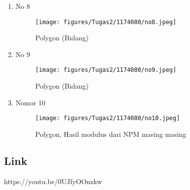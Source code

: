 \begin{enumerate}
\begin{figure}[H]
	\end{figure}
	\item No 8
	
	\begin{figure}[H]
		\texttt{[image: figures/Tugas2/1174080/no8.jpeg]}
		\centering
		\caption{Polygon (Bidang)}
	\end{figure}
	\item No 9
	
	\begin{figure}[H]
		\texttt{[image: figures/Tugas2/1174080/no9.jpeg]}
		\centering
		\caption{Polygon (Bidang)}
	\end{figure}
	\item Nomor 10
	
	\begin{figure}[H]
		\texttt{[image: figures/Tugas2/1174080/no10.jpeg]}
		\centering
		\caption{Polygon, Hasil modulus dari NPM masing masing}
	\end{figure}
\end{enumerate}
\subsection{Link}
https://youtu.be/0UJfyOOnzkw